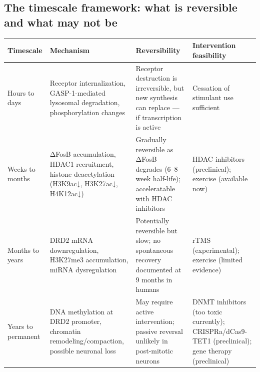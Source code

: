 \subsection{The timescale framework: what is reversible and what may not be}\label{15_d2_downregulation-the-timescale-framework-what-is-reversible-and-what-may-not-be}

{\def\LTcaptype{none} %
\begin{longtable}[]{@{}
  >{\raggedright\arraybackslash}p{}
  >{\raggedright\arraybackslash}p{}
  >{\raggedright\arraybackslash}p{}
  >{\raggedright\arraybackslash}p{}@{}}
\toprule\noalign{}
\begin{minipage}[b]{\linewidth}\raggedright
Timescale
\end{minipage} & \begin{minipage}[b]{\linewidth}\raggedright
Mechanism
\end{minipage} & \begin{minipage}[b]{\linewidth}\raggedright
Reversibility
\end{minipage} & \begin{minipage}[b]{\linewidth}\raggedright
Intervention feasibility
\end{minipage} \\
\midrule\noalign{}
\endhead
\bottomrule\noalign{}
\endlastfoot
Hours to days & Receptor internalization, GASP-1-mediated lysosomal degradation, phosphorylation changes & Receptor destruction is irreversible, but new synthesis can replace --- if transcription is active & Cessation of stimulant use sufficient \\
Weeks to months & ΔFosB accumulation, HDAC1 recruitment, histone deacetylation (H3K9ac↓, H3K27ac↓, H4K12ac↓) & Gradually reversible as ΔFosB degrades (6--8 week half-life); acceleratable with HDAC inhibitors & HDAC inhibitors (preclinical); exercise (available now) \\
Months to years & DRD2 mRNA downregulation, H3K27me3 accumulation, miRNA dysregulation & Potentially reversible but slow; no spontaneous recovery documented at 9 months in humans & rTMS (experimental); exercise (limited evidence) \\
Years to permanent & DNA methylation at DRD2 promoter, chromatin remodeling/compaction, possible neuronal loss & May require active intervention; passive reversal unlikely in post-mitotic neurons & DNMT inhibitors (too toxic currently); CRISPRa/dCas9-TET1 (preclinical); gene therapy (preclinical) \\
\end{longtable}
}

